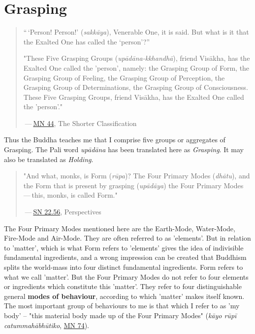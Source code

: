\chapter{Grasping}

\begin{quote}
``\,`Person! Person!' (\emph{sakkāya}), Venerable One, it is said. But what is it that the Exalted One has called the `person'?''

"These Five Grasping Groups (\emph{upādāna-kkhandhā}), friend Visākha, has the Exalted One called the 'person', namely: the Grasping Group of Form, the Grasping Group of Feeling, the Grasping Group of Perception, the Grasping Group of Determinations, the Grasping Group of Consciousness. These Five Grasping Groups, friend Visākha, has the Exalted One called the 'person'."

 --- \href{https://suttacentral.net/mn44/en/sujato}{MN 44}, The Shorter Classification
\end{quote}

Thus the Buddha teaches me that I comprise five groups or aggregates of Grasping. The Pali word \emph{upādāna} has been translated here as \emph{Grasping}. It may also be translated as \emph{Holding}.

\begin{quote}
"And what, monks, is Form (\emph{rūpa})? The Four Primary Modes (\emph{dhātu}), and the Form that is present by grasping (\emph{upādāya}) the Four Primary Modes --- this, monks, is called Form."

 --- \href{https://suttacentral.net/sn22.56/en/bodhi}{SN 22.56}, Perspectives
\end{quote}

The Four Primary Modes mentioned here are the Earth-Mode, Water-Mode, Fire-Mode and Air-Mode. They are often referred to as 'elements'. But in relation to 'matter', which is what Form refers to 'elements' gives the idea of indivisible fundamental ingredients, and a wrong impression can be created that Buddhism splits the world-mass into four distinct fundamental ingredients. Form refers to what we call 'matter'. But the Four Primary Modes do not refer to four elements or ingredients which constitute this 'matter'. They refer to four distinguishable general \textbf{modes of behaviour}, according to which 'matter' makes itself known. The most important group of behaviours to me is that which I refer to as 'my body' -- "this material body made up of the Four Primary Modes" (\emph{kāyo rūpī catummahābhūtiko}, \href{https://suttacentral.net/mn74/en/sujato}{MN 74}).

